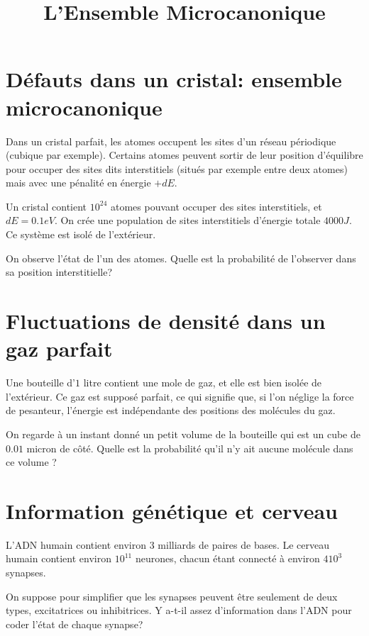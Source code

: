\documentclass[french]{article}
\begin{document}
	\title{L'Ensemble Microcanonique}
	\author{}
	\date{}
	
	\maketitle
	
	\section{Défauts dans un cristal: ensemble microcanonique}
	\begin{tcolorbox}[colback=blue!5!white,colframe=blue!75!black]
		\quad Dans un cristal parfait, les atomes occupent les sites d’un réseau périodique (cubique par exemple). Certains atomes peuvent sortir de leur position d’équilibre pour occuper des sites dits interstitiels (situés par exemple entre deux atomes) mais avec une pénalité en énergie $+dE$.
		
		\quad Un cristal contient $10^{24}$ atomes pouvant occuper des sites interstitiels, et $dE=0.1eV$. On crée une population de sites interstitiels d’énergie totale $4000J$. Ce système est isolé de l’extérieur.
		
		\quad On observe l’état de l’un des atomes. Quelle est la probabilité de l’observer dans sa position interstitielle?
	\end{tcolorbox}

	\section{Fluctuations de densité dans un gaz parfait}
	\begin{tcolorbox}[colback=blue!5!white,colframe=blue!75!black]
		\quad Une bouteille d’$1$ litre contient une mole de gaz, et elle est bien isolée de l’extérieur. Ce gaz est supposé parfait, ce qui signifie que, si l’on néglige la force de pesanteur, l’énergie est indépendante des positions des molécules du gaz.
		
		\quad On regarde à un instant donné un petit volume de la bouteille qui est un cube de $0.01$ micron de côté. Quelle est la probabilité qu’il n’y ait aucune molécule dans ce volume ?
	\end{tcolorbox}


	\section{Information génétique et cerveau}
	\begin{tcolorbox}[colback=blue!5!white,colframe=blue!75!black]
		\quad L'ADN humain contient environ $3$ milliards de paires de bases. Le cerveau humain contient environ $10^{11}$ neurones, chacun étant connecté à environ 	$410^3$ synapses.
		
		\quad On suppose pour simplifier que les synapses peuvent être seulement de deux types, excitatrices ou inhibitrices. Y a-t-il assez d'information dans l'ADN pour coder l'état de chaque synapse?
	\end{tcolorbox}
	
	
	
\end{document}
